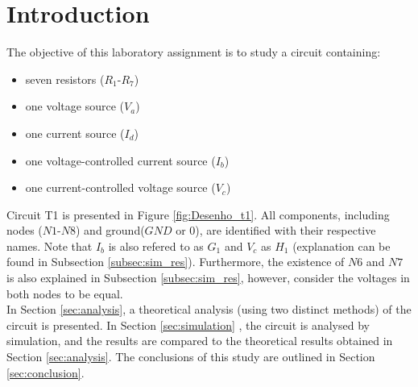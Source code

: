 
\section{Introduction}
\label{sec:introduction}


The objective of this laboratory assignment is to study a circuit containing:
\begin{itemize}
	\item seven resistors ($R_1$-$R_7$)
	\item one voltage source ($V_a$)
	\item one current source ($I_d$)
	\item one voltage-controlled current source ($I_b$)
	\item one current-controlled voltage source ($V_c$)
\end{itemize}


Circuit T1 is presented in Figure \ref{fig:Desenho_t1}. All components, including nodes
($N1$-$N8$) and ground($GND$ or $0$), are identified with their respective names. Note
that $I_b$ is also refered to as $G_1$ and $V_c$ as $H_1$ (explanation can be found in 
Subsection \ref{subsec:sim_res}). Furthermore, the existence of $N6$ and $N7$ is also
explained in Subsection \ref{subsec:sim_res}, however, consider the voltages in both nodes
to be equal. \\

In Section \ref{sec:analysis}, a theoretical analysis (using two distinct methods) of
the circuit is presented. In Section \ref{sec:simulation} , the circuit is analysed by
simulation, and the results are compared to the theoretical results obtained in Section
\ref{sec:analysis}. The conclusions of this study are outlined in Section \ref{sec:conclusion}.


